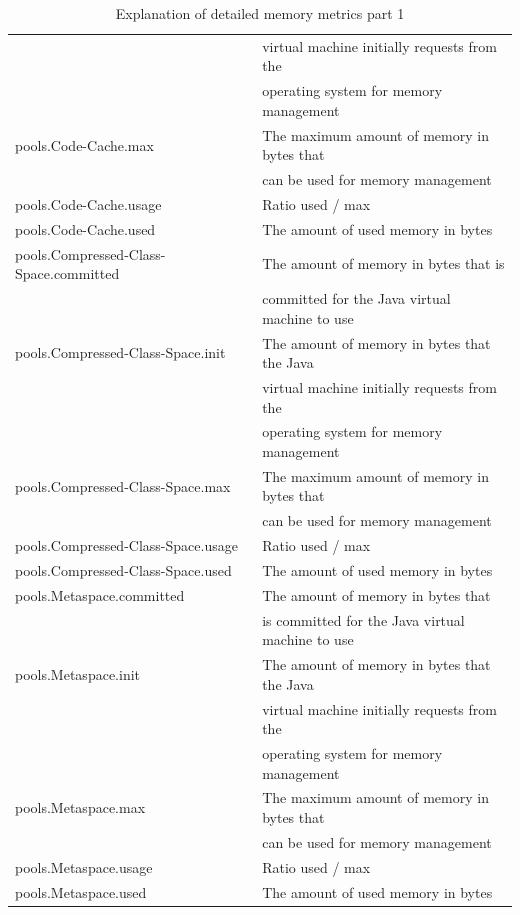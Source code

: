 \documentclass{seal_thesis}
\begin{document}
\begin{table}[ht]
\begin{tabular}{|l|l|}
						& virtual machine initially requests from the \\
						& operating system for memory management \\ \hline
pools.Code-Cache.max 	& The maximum amount of memory in bytes that \\
						& can be used for memory management \\ \hline
pools.Code-Cache.usage & Ratio used / max \\ \hline
pools.Code-Cache.used & The amount of used memory in bytes \\ \hline
pools.Compressed-Class-Space.committed & The amount of memory in bytes that is \\
					& committed for the Java virtual machine to use \\ \hline
pools.Compressed-Class-Space.init & The amount of memory in bytes that the Java \\ 
									& virtual machine initially requests from the \\
									& operating system for memory management \\ \hline
pools.Compressed-Class-Space.max & The maximum amount of memory in bytes that \\
								&  can be used for memory management \\ \hline
pools.Compressed-Class-Space.usage & Ratio used / max \\ \hline
pools.Compressed-Class-Space.used & The amount of used memory in bytes \\ \hline
pools.Metaspace.committed & The amount of memory in bytes that \\
							& is committed for the Java virtual machine to use \\ \hline
pools.Metaspace.init & The amount of memory in bytes that the Java \\
					& virtual machine initially requests from the \\
					& operating system for memory management \\ \hline
pools.Metaspace.max & The maximum amount of memory in bytes that \\
					& can be used for memory management \\ \hline
pools.Metaspace.usage & Ratio used / max \\ \hline
pools.Metaspace.used & The amount of used memory in bytes \\ \hline

\end{tabular}
\caption{Explanation of detailed memory metrics part 1}
\label{tab:detailed-heap_metrics1}
\end{table}
\end{document}

